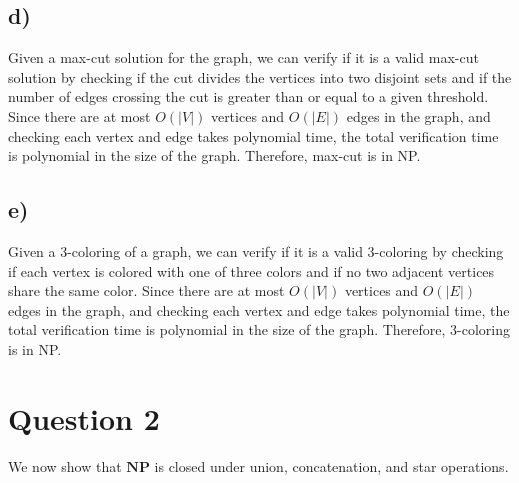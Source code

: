 \documentclass[a4paper, UTF-8]{article}
\theoremstyle{plain}
\begin{document}
\subsection{d)} 

Given a max-cut solution for the graph, we can verify if it is a valid max-cut solution by checking if the cut divides the vertices into two disjoint sets and if the number of edges crossing the cut is greater than or equal to a given threshold. Since there are at most $O(|V|)$ vertices and $O(|E|)$ edges in the graph, and checking each vertex and edge takes polynomial time, the total verification time is polynomial in the size of the graph. Therefore, max-cut is in NP.

\subsection{e)} 

Given a 3-coloring of a graph, we can verify if it is a valid 3-coloring by checking if each vertex is colored with one of three colors and if no two adjacent vertices share the same color. Since there are at most $O(|V|)$ vertices and $O(|E|)$ edges in the graph, and checking each vertex and edge takes polynomial time, the total verification time is polynomial in the size of the graph. Therefore, 3-coloring is in NP.

\section{Question 2} 

We now show that $\textbf{NP}$ is closed under union, concatenation, and star operations. 
\end{document}
